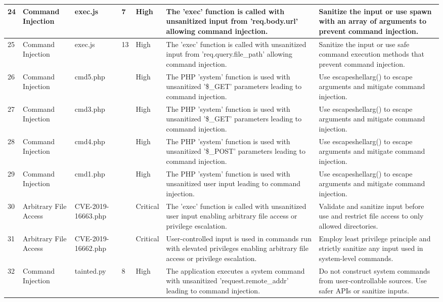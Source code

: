 \begin{landscape}
\begin{table}[H]
{\begin{tabular}{|l|p{4cm}|p{3cm}|p{2cm}|p{1.5cm}|p{12cm}|p{9cm}|}
      24 & Command Injection & exec.js & 7 & High & The 'exec' function is called with unsanitized input from 'req.body.url' allowing command injection. & Sanitize the input or use spawn with an array of arguments to prevent command injection. \\ \hline
      25 & Command Injection & exec.js & 13 & High & The 'exec' function is called with unsanitized input from 'req.query.file\_path' allowing command injection. & Sanitize the input or use safe command execution methods that prevent command injection. \\ \hline
      26 & Command Injection & cmd5.php & ~ & High & The PHP 'system' function is used with unsanitized '\$\_GET' parameters leading to command injection. & Use escapeshellarg() to escape arguments and mitigate command injection. \\ \hline
      27 & Command Injection & cmd3.php & ~ & High & The PHP 'system' function is used with unsanitized '\$\_GET' parameters leading to command injection. & Use escapeshellarg() to escape arguments and mitigate command injection. \\ \hline
      28 & Command Injection & cmd4.php & ~ & High & The PHP 'system' function is used with unsanitized '\$\_POST' parameters leading to command injection. & Use escapeshellarg() to escape arguments and mitigate command injection. \\ \hline
      29 & Command Injection & cmd1.php & ~ & High & The PHP 'system' function is used with unsanitized user input leading to command injection. & Use escapeshellarg() to escape arguments and mitigate command injection. \\ \hline
      30 & Arbitrary File Access & CVE-2019-16663.php & ~ & Critical & The 'exec' function is called with unsanitized user input enabling arbitrary file access or privilege escalation. & Validate and sanitize input before use and restrict file access to only allowed directories. \\ \hline
      31 & Arbitrary File Access & CVE-2019-16662.php & ~ & Critical & User-controlled input is used in commands run with elevated privileges enabling arbitrary file access or privilege escalation. & Employ least privilege principle and strictly sanitize any input used in system-level commands. \\ \hline
      32 & Command Injection & tainted.py & 8 & High & The application executes a system command with unsanitized 'request.remote\_addr' leading to command injection. & Do not construct system commands from user-controllable sources. Use safer APIs or sanitize inputs. \\ \hline

\end{tabular}}
\end{table}
\end{landscape}

